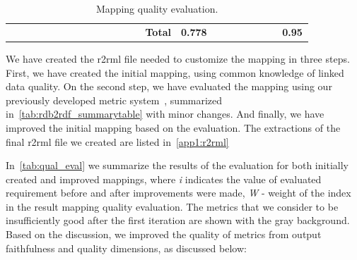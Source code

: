 \documentclass[PhD, Submit, ngerman,UKenglish,table]{scrbook}
\begin{document}
\begin{table}[!ht]
\begin{tabular}{p{0.05\linewidth}|p{0.28\linewidth}|p{0.11\linewidth}|p{0.09\linewidth}|p{0.06\linewidth}|p{0.11\linewidth}|p{0.09\linewidth}|p{0.06\linewidth}}
\midrule
\multicolumn{4}{r|}{\textbf{Total}}& \textbf{0.778}  & & & \textbf{0.95} \\

\end{tabular}
\caption{Mapping quality evaluation.}
\label{tab:qual_eval}

\end{table}

We have created the \gls{r2rml} file needed to customize the mapping in three steps.
First, we have created the initial mapping, using common knowledge of linked data quality.
On the second step, we have evaluated the mapping using our previously developed metric system~\cite{rdb2rdf}, summarized in~\autoref{tab:rdb2rdf_summarytable} with minor changes.
And finally, we have improved the initial mapping based on the evaluation.
The extractions of the final \gls{r2rml} file we created are listed in~\autoref{app1:r2rml}

In~\autoref{tab:qual_eval} we summarize the results of the evaluation for both initially created and improved mappings, where \emph{i} indicates the value of evaluated requirement before and after improvements were made, \emph{W} - weight of the index in the result mapping quality evaluation.
The metrics that we consider to be insufficiently good after the first iteration are shown with the gray background.
Based on the discussion, we improved the quality of metrics from output faithfulness and quality dimensions, as discussed below:
\end{document}
